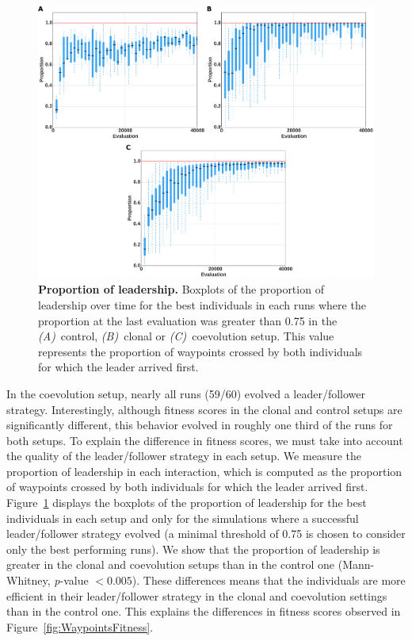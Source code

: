     \begin{figure}[h]
      \centerfloat
        \includegraphics[scale=0.8]{fig/ArticleRob1/figLeadership.png}
      \caption{\textbf{Proportion of leadership.}
      Boxplots of the proportion of leadership over time for the best individuals in each runs where the proportion at the last evaluation was greater than 0.75 in the {\em (A)}~control, {\em (B)}~clonal or {\em (C)}~coevolution setup. This value represents the proportion of waypoints crossed by both individuals for which the leader arrived first.}
      \label{fig:WaypointsLeadership}
    \end{figure}

    In the coevolution setup, nearly all runs (59/60) evolved a leader/follower strategy. Interestingly, although fitness scores in the clonal and control setups are significantly different, this behavior evolved in roughly one third of the runs for both setups. To explain the difference in fitness scores, we must take into account the quality of the leader/follower strategy in each setup. We measure the proportion of leadership in each interaction, which is computed as the proportion of waypoints crossed by both individuals for which the leader arrived first. Figure~\ref{fig:WaypointsLeadership} displays the boxplots of the proportion of leadership for the best individuals in each setup and only for the simulations where a successful leader/follower strategy evolved (a minimal threshold of 0.75 is chosen to consider only the best performing runs). We show that the proportion of leadership is greater in the clonal and coevolution setups than in the control one (Mann-Whitney, {\em p}-value $< 0.005$). These differences means that the individuals are more efficient in their leader/follower strategy in the clonal and coevolution settings than in the control one. This explains the differences in fitness scores observed in Figure~\ref{fig:WaypointsFitness}.

